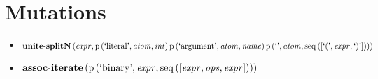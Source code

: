 \section{Mutations}
{\footnotesize\begin{itemize}
\item $\mathbf{unite\text{-}splitN}\left(\mathit{expr},\\\mathrm{p}\left(\text{`literal'},\mathit{atom},\mathit{int}\right)\\\mathrm{p}\left(\text{`argument'},\mathit{atom},\mathit{name}\right)\\\mathrm{p}\left(\text{`'},\mathit{atom},\mathrm{seq}\left(\left[\text{`('}, \mathit{expr}, \text{`)'}\right]\right)\right)\right)$
\item $\mathbf{assoc\text{-}iterate}\\\left(\mathrm{p}\left(\text{`binary'},\mathit{expr},\mathrm{seq}\left(\left[\mathit{expr}, \mathit{ops}, \mathit{expr}\right]\right)\right)\right)$
\end{itemize}}

